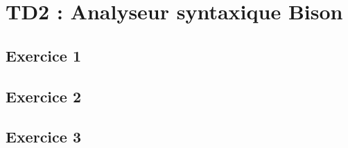 \chapter{TD2 : Analyseur syntaxique Bison}

\section{Exercice 1}


\section{Exercice 2}


\section{Exercice 3}


